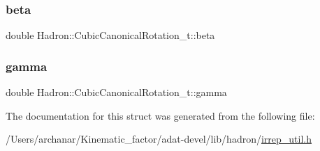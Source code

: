 \mbox{\label{structHadron_1_1CubicCanonicalRotation__t_ab83a3c8b939f4504a500f68550975fcb}} 
\subsubsection{\texorpdfstring{beta}{beta}}
{\footnotesize\ttfamily double Hadron\+::\+Cubic\+Canonical\+Rotation\+\_\+t\+::beta}

\mbox{\label{structHadron_1_1CubicCanonicalRotation__t_ae0064ce8b13dab53e29ef1dd2cae1e8b}} 
\subsubsection{\texorpdfstring{gamma}{gamma}}
{\footnotesize\ttfamily double Hadron\+::\+Cubic\+Canonical\+Rotation\+\_\+t\+::gamma}



The documentation for this struct was generated from the following file\+:\begin{DoxyCompactItemize}
\item 
/\+Users/archanar/\+Kinematic\+\_\+factor/adat-\/devel/lib/hadron/\mbox{\hyperlink{adat-devel_2lib_2hadron_2irrep__util_8h}{irrep\+\_\+util.\+h}}\end{DoxyCompactItemize}
